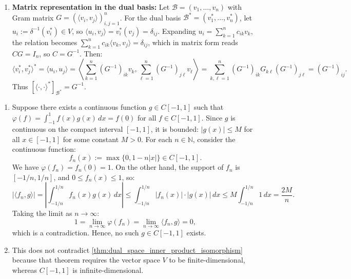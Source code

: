 \begin{exercisesolution}
\begin{enumerate}[label=\textbf{(\alph*)}]
    \item \textbf{Matrix representation in the dual basis:}
    Let $\mathcal{B} = (v_1, \dots, v_n)$ with Gram matrix $G = (\langle v_i, v_j \rangle)_{i,j=1}^n$.
    For the dual basis $\mathcal{B}^* = (v_1^*, \dots, v_n^*)$, let $u_i := \delta^{-1}(v_i^*) \in V$, so $\langle u_i, v_j \rangle = v_i^*(v_j) = \delta_{ij}$.
    Expanding $u_i = \sum_{k=1}^n c_{ik} v_k$, the relation becomes $\sum_{k=1}^n c_{ik} \langle v_k, v_j \rangle = \delta_{ij}$, which in matrix form reads $C G = I_n$, so $C = G^{-1}$.
    Then:
    \[
    \langle v_i^*, v_j^* \rangle^* = \langle u_i, u_j \rangle = \left\langle \sum_{k=1}^n (G^{-1})_{ik} v_k, \sum_{\ell=1}^n (G^{-1})_{j\ell} v_\ell \right\rangle = \sum_{k,\ell=1}^n (G^{-1})_{ik} G_{k\ell} (G^{-1})_{j\ell} = (G^{-1})_{ij}.
    \]
    Thus $[\langle \cdot, \cdot \rangle^*]_{\mathcal{B}^*} = G^{-1}$. \qedhere
\end{enumerate}
\end{exercisesolution}

\begin{exercisesolution}
\label{sol:riesz_failure_infinite_dimensions}
\begin{enumerate}[label=\textbf{(\alph*)}]
    \item Suppose there exists a continuous function $g \in C[-1, 1]$ such that $\varphi(f) = \int_{-1}^1 f(x) g(x) \, dx = f(0)$ for all $f \in C[-1, 1]$.
    Since $g$ is continuous on the compact interval $[-1, 1]$, it is bounded: $|g(x)| \le M$ for all $x \in [-1, 1]$ for some constant $M > 0$.
    For each $n \in \mathbb{N}$, consider the continuous function:
    \[
    f_n(x) := \max\{0, 1 - n|x|\} \in C[-1, 1].
    \]
    We have $\varphi(f_n) = f_n(0) = 1$.
    On the other hand, the support of $f_n$ is $[-1/n, 1/n]$, and $0 \le f_n(x) \le 1$, so:
    \[
    |\langle f_n, g \rangle| = \left| \int_{-1/n}^{1/n} f_n(x) g(x) \, dx \right| \le \int_{-1/n}^{1/n} |f_n(x)| \cdot |g(x)| \, dx \le M \int_{-1/n}^{1/n} 1 \, dx = \frac{2M}{n}.
    \]
    Taking the limit as $n \to \infty$:
    \[
    1 = \lim_{n \to \infty} \varphi(f_n) = \lim_{n \to \infty} \langle f_n, g \rangle = 0,
    \]
    which is a contradiction. Hence, no such $g \in C[-1, 1]$ exists.

    \item This does not contradict \cref{thm:dual_space_inner_product_isomorphism} because that theorem requires the vector space $V$ to be finite-di\-men\-sional, whereas $C[-1, 1]$ is infinite-di\-men\-sional. \qedhere
\end{enumerate}
\end{exercisesolution}


